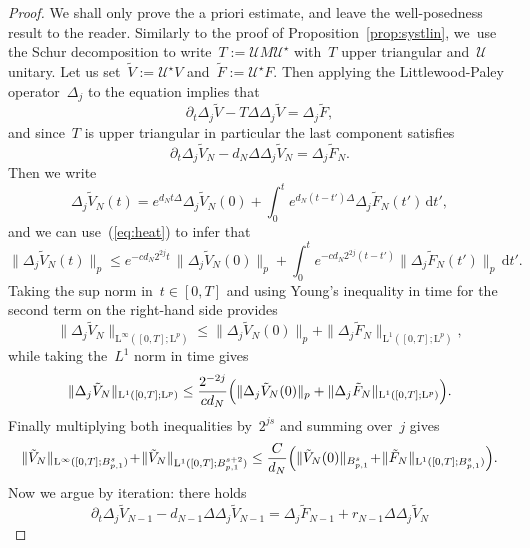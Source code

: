 \documentclass[10pt]{amsart}
\theoremstyle{definition}
\newcommand\dd{\mathrm{d}}
\renewcommand\L{\mathrm{L}}
\begin{document}
\begin{proof}
We shall only prove the a priori estimate, and leave the well-posedness result to the reader. Similarly to the proof of Proposition~\ref{prop:systlin}, we~use the Schur decomposition to write~$T:= \mathcal U M \mathcal U^\star$ with~$ T$ upper triangular and~$\mathcal U$ unitary.
Let us set~$\tilde V:= \mathcal U^\star V$ and~$\tilde F:= \mathcal U^\star F$. Then applying the Littlewood-Paley operator~$\Delta_j $ to the equation implies that\vspace*{-3pt}
\[
\partial_t \Delta_j \tilde V-T \Delta\Delta_j \tilde V = \Delta_j\tilde F,
\]
and since~$T$ is upper triangular in particular the last component satisfies\vspace*{-3pt}
\[
\partial_t \Delta_j \tilde V_N -d_N \Delta\Delta_j \tilde V_N = \Delta_j\tilde F_N.
\]
Then we write\vspace*{-3pt}\enlargethispage{.5\baselineskip}
\[
\Delta_j \tilde V_N(t) = e^{d_Nt \Delta}\Delta_j \tilde V_N(0) + \int_0^t e^{d_N(t-t') \Delta}\Delta_j \tilde F_N(t') \, \dd t',
\]
and we can use~(\ref{eq:heat}) to infer that\vspace*{-3pt}
\[
\| \Delta_j \tilde V_N(t)\|_p \leq e^{- cd_N2^{2j}t }\,\| \Delta_j \tilde V_N(0)\|_p + \int_0^t e^{- cd_N2^{2j}(t-t') }\| \Delta_j\tilde F_N(t')\|_p \,\dd t'.
\]
Taking the sup norm in~$t \in [0,T]$ and using Young's inequality in time for the second term on the right-hand side provides\vspace*{-3pt}
\[
\| \Delta_j \tilde V_N \|_{\L^\infty([0,T];\L^p)} \leq \| \Delta_j \tilde V_N(0)\|_p + \|\Delta_j\tilde F_N \|_{\L^1([0,T];\L^p)},
\]
while taking the~$L^1$ norm in time gives\vspace*{-3pt}
\[
\| \Delta_j \tilde V_N \|_{\L^1([0,T];\L^p)} \leq \frac {2^{-2j}}{c d_N} \Bigl(\| \Delta_j \tilde V_N(0)\|_p + \|\Delta_j\tilde F_N \|_{\L^1([0,T];\L^p)}\Bigr).
\]
Finally multiplying both inequalities by~$2^{js} $ and summing over~$j$ gives\vspace*{-3pt}
\begin{equation}
\label{eq: VN}
\| \tilde V_N \|_{\L^\infty([0,T];B^s_{p,1})} \!+\! \| \tilde V_N \|_{\L^1([0,T];B^{s+2}_{p,1})} \leq \frac C {d_N} \Bigl(\| \tilde V_N (0)\|_{B^s_{p,1}} \!+\! \| \tilde F_N \|_{\L^1([0,T];B^s_{p,1})} \Bigr).
\end{equation}
Now we argue by iteration: there holds\vspace*{-3pt}
\[
\partial_t \Delta_j \tilde V_{N-1} - d_{N-1} \Delta\Delta_j \tilde V_{N-1} = \Delta_j\tilde F_{N-1} + r_{N-1}\Delta \Delta_j \tilde V_{N }
\]
\end{proof}
\end{document}
